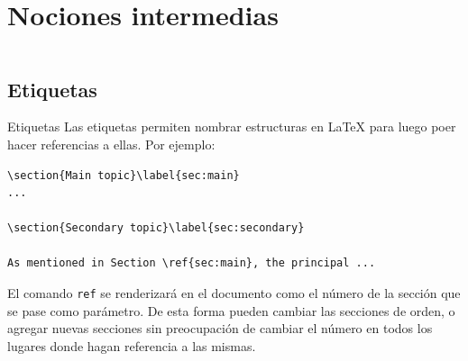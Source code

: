 \section{Nociones intermedias}
\begin{frame}
    \begin{columns}[t]
        \begin{column}{.5\textwidth}
          \tableofcontents[sections={1-2},currentsection]
        \end{column}
        \begin{column}{.5\textwidth}
          \tableofcontents[sections={3-4},currentsection]
        \end{column}
    \end{columns}
\end{frame}

\subsection{Etiquetas}
\begin{frame}[fragile]{Etiquetas}
  Las etiquetas permiten nombrar estructuras en \LaTeX{} para luego poer hacer
referencias a ellas. Por ejemplo:

\begin{lstlisting}[basicstyle=\tiny]
\section{Main topic}\label{sec:main}
...

\section{Secondary topic}\label{sec:secondary}

As mentioned in Section \ref{sec:main}, the principal ...
\end{lstlisting}

El comando \texttt{ref} se renderizará en el documento como el número de la
sección que se pase como parámetro. De esta forma pueden cambiar las secciones
de orden, o agregar nuevas secciones sin preocupación de cambiar el número en
todos los lugares donde hagan referencia a las mismas.

\end{frame}

